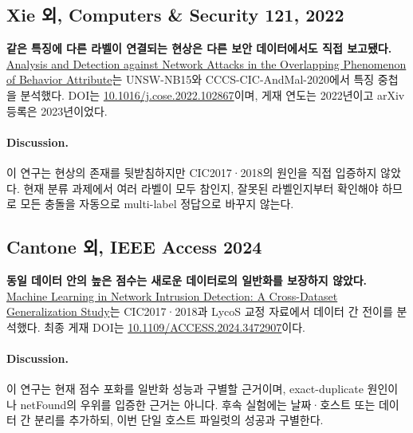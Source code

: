 \subsection{Xie 외, Computers \& Security 121, 2022}
\textbf{같은 특징에 다른 라벨이 연결되는 현상은 다른 보안 데이터에서도 직접 보고됐다.} \href{https://arxiv.org/abs/2310.10660}{Analysis and Detection against Network Attacks in the Overlapping Phenomenon of Behavior Attribute}는 UNSW-NB15와 CCCS-CIC-AndMal-2020에서 특징 중첩을 분석했다. DOI는 \href{https://doi.org/10.1016/j.cose.2022.102867}{10.1016/j.cose.2022.102867}이며, 게재 연도는 2022년이고 arXiv 등록은 2023년이었다.
\paragraph{Discussion.} 이 연구는 현상의 존재를 뒷받침하지만 CIC2017·2018의 원인을 직접 입증하지 않았다. 현재 분류 과제에서 여러 라벨이 모두 참인지, 잘못된 라벨인지부터 확인해야 하므로 모든 충돌을 자동으로 multi-label 정답으로 바꾸지 않는다.

\subsection{Cantone 외, IEEE Access 2024}
\textbf{동일 데이터 안의 높은 점수는 새로운 데이터로의 일반화를 보장하지 않았다.} \href{https://iris.unicas.it/handle/11580/110014}{Machine Learning in Network Intrusion Detection: A Cross-Dataset Generalization Study}는 CIC2017·2018과 LycoS 교정 자료에서 데이터 간 전이를 분석했다. 최종 게재 DOI는 \href{https://doi.org/10.1109/ACCESS.2024.3472907}{10.1109/ACCESS.2024.3472907}이다.
\paragraph{Discussion.} 이 연구는 현재 점수 포화를 일반화 성능과 구별할 근거이며, exact-duplicate 원인이나 netFound의 우위를 입증한 근거는 아니다. 후속 실험에는 날짜·호스트 또는 데이터 간 분리를 추가하되, 이번 단일 호스트 파일럿의 성공과 구별한다.

